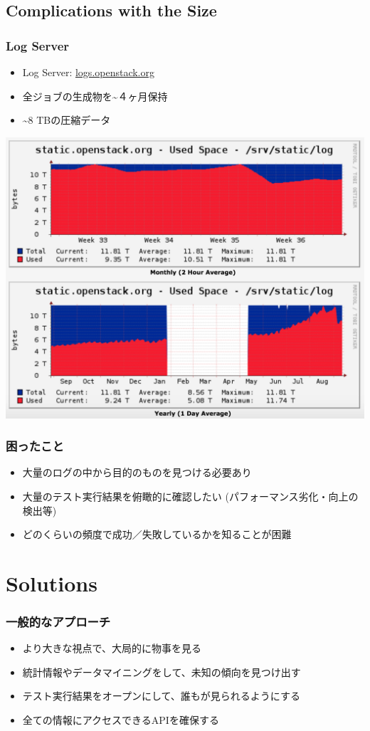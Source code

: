 \documentclass[aspectratio=169,11pt,hyperref={colorlinks=true}]{beamer}
\begin{document}
\subsection{Complications with the Size}
\begin{frame}
  \frametitle{Log Server}
  \begin{itemize}
    \item Log Server: \href{http://logs.openstack.org/}{logs.openstack.org}
    \item 全ジョブの生成物を\textasciitilde４ヶ月保持
    \item \textasciitilde8 TBの圧縮データ
  \end{itemize}
  \begin{center}
    \includegraphics[width=.55\textwidth]{cacti-static-openstack-org-log-graph.png}
  \end{center}
\end{frame}

\begin{frame}
  \frametitle{困ったこと}
  \begin{itemize}
    \item 大量のログの中から目的のものを見つける必要あり
    \item 大量のテスト実行結果を俯瞰的に確認したい (パフォーマンス劣化・向上の検出等)
    \item どのくらいの頻度で成功／失敗しているかを知ることが困難
  \end{itemize}
\end{frame}

\section{Solutions}
\begin{frame}
  \frametitle{一般的なアプローチ}
    \begin{itemize}
        \item より大きな視点で、大局的に物事を見る
        \item 統計情報やデータマイニングをして、未知の傾向を見つけ出す
        \item テスト実行結果をオープンにして、誰もが見られるようにする
        \item 全ての情報にアクセスできるAPIを確保する
    \end{itemize}
\end{frame}
\end{document}
